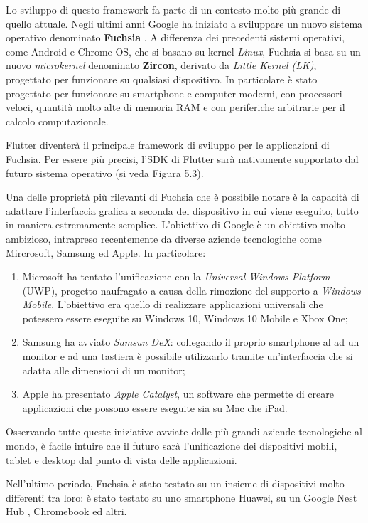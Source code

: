 Lo sviluppo di questo framework fa parte di un contesto molto più grande di quello attuale. Negli ultimi anni Google ha iniziato a sviluppare un nuovo sistema operativo denominato \textbf{Fuchsia} \cite{fuchsia} \cite{fuchsia_wikipedia}. A differenza dei precedenti sistemi operativi, come Android e Chrome OS, che si basano su kernel \textit{Linux}, Fuchsia si basa su un nuovo \textit{microkernel} denominato \textbf{Zircon}, derivato da \textit{Little Kernel (LK)}, progettato per funzionare su qualsiasi dispositivo. In particolare è stato progettato per funzionare su smartphone e computer moderni, con processori veloci, quantità molto alte di memoria RAM e con periferiche arbitrarie per il calcolo computazionale.

Flutter diventerà il principale framework di sviluppo per le applicazioni di Fuchsia. Per essere più precisi, l'SDK di Flutter sarà nativamente supportato dal futuro sistema operativo (si veda Figura 5.3).

Una delle proprietà più rilevanti di Fuchsia che è possibile notare è la capacità di adattare l'interfaccia grafica a seconda del dispositivo in cui viene eseguito, tutto in maniera estremamente semplice. L'obiettivo di Google è un obiettivo molto ambizioso, intrapreso recentemente da diverse aziende tecnologiche come Mircrosoft, Samsung ed Apple. In particolare:
\begin{enumerate}
	\item Microsoft ha tentato l'unificazione con la \textit{Universal Windows Platform} (UWP), progetto naufragato a causa della rimozione del supporto a \textit{Windows Mobile}. L'obiettivo era quello di realizzare applicazioni universali che potessero essere eseguite su Windows 10, Windows 10 Mobile e Xbox One;
	\item Samsung ha avviato \textit{Samsun DeX}: collegando il proprio smartphone al ad un monitor e ad una tastiera è possibile utilizzarlo tramite un'interfaccia che si adatta alle dimensioni di un monitor;
	\item Apple ha presentato \textit{Apple Catalyst}, un software che permette di creare applicazioni che possono essere eseguite sia su Mac che iPad.
\end{enumerate}

Osservando tutte queste iniziative  avviate dalle più grandi aziende tecnologiche al mondo, è facile intuire che il futuro sarà l'unificazione dei dispositivi mobili, tablet e desktop dal punto di vista delle applicazioni.

Nell'ultimo periodo, Fuchsia è stato testato su un insieme di dispositivi molto differenti tra loro: è stato testato su uno smartphone Huawei, su un Google Nest Hub \cite{fuchsia_google_nest_hub}, Chromebook ed altri.

